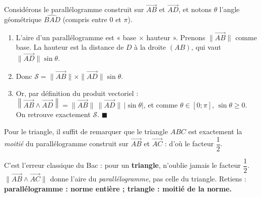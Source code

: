 \documentclass[11pt]{article}
\begin{document}
\begin{experience}
Considérons le parallélogramme construit sur $\overrightarrow{AB}$ et $\overrightarrow{AD}$, et notons $\theta$ l'angle géométrique $\widehat{BAD}$ (compris entre $0$ et $\pi$).
\begin{enumerate}
\item L'aire d'un parallélogramme est « base $\times$ hauteur ». Prenons $\|\overrightarrow{AB}\|$ comme base. La hauteur est la distance de $D$ à la droite $(AB)$, qui vaut $\|\overrightarrow{AD}\| \sin\theta$.
\item Donc $\mathcal{S} = \|\overrightarrow{AB}\| \times \|\overrightarrow{AD}\| \sin\theta$.
\item Or, par définition du produit vectoriel : $\left\|\overrightarrow{AB} \wedge \overrightarrow{AD}\right\| = \|\overrightarrow{AB}\|\,\|\overrightarrow{AD}\|\,|\sin\theta|$, et comme $\theta \in [0 ; \pi]$, $\sin\theta \geq 0$. On retrouve exactement $\mathcal{S}$. \hfill$\blacksquare$
\end{enumerate}
Pour le triangle, il suffit de remarquer que le triangle $ABC$ est exactement la \emph{moitié} du parallélogramme construit sur $\overrightarrow{AB}$ et $\overrightarrow{AC}$ : d'où le facteur $\dfrac{1}{2}$.
\end{experience}

\begin{attention}
C'est l'erreur classique du Bac : pour un \textbf{triangle}, n'oublie jamais le facteur $\dfrac{1}{2}$. $\|\overrightarrow{AB} \wedge \overrightarrow{AC}\|$ donne l'aire du \emph{parallélogramme}, pas celle du triangle. Retiens : \textbf{parallélogramme : norme entière ; triangle : moitié de la norme.}
\end{attention}
\end{document}
